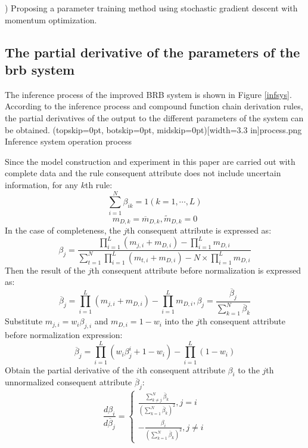 \documentclass{ieeeaccess}
\begin{document}
) Proposing a parameter training method using stochastic gradient descent with momentum optimization.

\subsection{The partial derivative of the parameters of the brb system}
The inference process of the improved BRB system is shown in Figure \ref{infsys}.
According to the inference process and compound function chain derivation rules, the partial derivatives of the output to the different parameters of the system can be obtained.
\Figure[!t](topskip=0pt, botskip=0pt, midskip=0pt)[width=3.3 in]{process.png}
{Inference system operation process\label{infsys}}

Since the model construction and experiment in this paper are carried out with complete data and
the rule consequent attribute does not include uncertain information, for any $k$th rule:
\begin{equation}
    \sum_{i=1}^N\beta_{ik}=1(k=1,\cdots,L)
\end{equation}
\begin{equation}
    m_{D,k}=\overline{m}_{D,k},\widetilde{m}_{D,k}=0
\end{equation}
In the case of completeness, the $j$th consequent attribute is expressed as:
\begin{equation}
    \beta_j=\frac{\prod_{i=1}^L(m_{j,i}+m_{D,i})-\prod_{i=1}^Lm_{D,i}}{\sum_{t=1}^N\prod_{i=1}^L(m_{t,i}+m_{D,i})-N\times\prod_{i=1}^Lm_{D,i}}
\end{equation}
Then the result of the $j$th consequent attribute before normalization is expressed as:
\begin{equation}
    \overline{\beta}_j = \prod_{i=1}^L(m_{j,i}+m_{D,i})-\prod_{i=1}^Lm_{D,i},\beta_j=\frac{\overline{\beta}_j}{\sum_{k=1}^N\overline{\beta}_k}
\end{equation}
Substitute $m_{j,i}=w_i\beta_{j,i}$ and $m_{D,i}=1-w_i$ into the $j$th consequent attribute before normalization expression:
\begin{equation}
    \overline{\beta}_j = \prod_{i=1}^L(w_i\beta_j^i+1-w_i)-\prod_{i=1}^L{(1-w_i)}
\end{equation}
Obtain the partial derivative of the $i$th consequent attribute $\beta_i$ to the $j$th unnormalized consequent attribute $\overline{\beta}_j$:
\begin{equation}
    \frac{d\beta_i}{d\overline{\beta}_j}=
    \left\{
    \begin{aligned}
        \frac{\sum_{k\neq j}^N\overline{\beta}_k}{(\sum_{k=1}^N\overline{\beta}_k)^2},j=i \\
        -\frac{\beta_i}{(\sum_{k=1}^N\overline{\beta}_k)^2},j\neq i
    \end{aligned}
    \right.
\end{equation}
\end{document}
